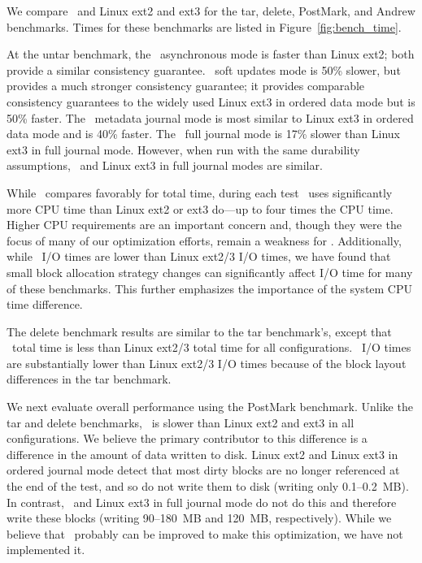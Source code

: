 We compare \Kudos\ and Linux ext2 and ext3 for the tar, delete,
PostMark, and Andrew benchmarks. Times for these benchmarks are listed
in Figure~\ref{fig:bench_time}.

\benchtable{}

At the untar benchmark, the \Kudos\ asynchronous mode is faster than
Linux ext2; both provide a similar consistency guarantee.
%
\Kudos\ soft updates mode is 50\% slower, but provides a much stronger
consistency guarantee; it provides comparable consistency guarantees
to the widely used Linux ext3 in ordered data mode but is 50\% faster.
%
The \Kudos\ metadata journal mode is most similar to Linux ext3 in
ordered data mode and is 40\% faster.
%
The \Kudos\ full journal mode is 17\% slower than Linux ext3 in full
journal mode.
%
However, when run with the same durability assumptions, \Kudos\ and
Linux ext3 in full journal modes are similar.

While \Kudos\ compares favorably for total time, during each test
\Kudos\ uses significantly more CPU time than Linux ext2 or ext3
do---up to four times the CPU time.
%
Higher CPU requirements are an important concern and, though they were
the focus of many of our optimization efforts, remain a weakness
for \Kudos.
%
Additionally, while \Kudos\ I/O times are lower than Linux ext2/3 I/O
times, we have found that small block allocation strategy changes can
significantly affect I/O time for many of these benchmarks. This further
emphasizes the importance of the system CPU time difference.


The delete benchmark results are similar to the tar benchmark's,
except that \Kudos\ total time is less than Linux ext2/3 total time
for all configurations. \Kudos\ I/O times are substantially lower
than Linux ext2/3 I/O times because of the block layout differences in
the tar benchmark.

We next evaluate overall performance using the PostMark benchmark.
Unlike the tar and delete benchmarks, \Kudos\ is slower than Linux
ext2 and ext3 in all configurations.
%
We believe the primary contributor to this difference is a difference
in the amount of data written to disk. Linux ext2 and Linux ext3 in
ordered journal mode detect that most dirty blocks are no longer
referenced at the end of the test, and so do not write them to disk
(writing only 0.1--0.2~MB). In contrast, \Kudos\ and Linux ext3 in
full journal mode do not do this and therefore write these blocks
(writing 90--180~MB and 120~MB, respectively).
%
While we believe that \Kudos\ probably can be improved to make this
optimization, we have not implemented it.
%

